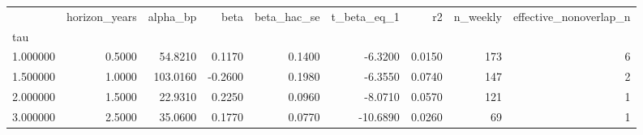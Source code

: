 \begin{tabular}{lrrrrrrrr}
\toprule
 & horizon\_years & alpha\_bp & beta & beta\_hac\_se & t\_beta\_eq\_1 & r2 & n\_weekly & effective\_nonoverlap\_n \\
tau &  &  &  &  &  &  &  &  \\
\midrule
1.000000 & 0.5000 & 54.8210 & 0.1170 & 0.1400 & -6.3200 & 0.0150 & 173 & 6 \\
1.500000 & 1.0000 & 103.0160 & -0.2600 & 0.1980 & -6.3550 & 0.0740 & 147 & 2 \\
2.000000 & 1.5000 & 22.9310 & 0.2250 & 0.0960 & -8.0710 & 0.0570 & 121 & 1 \\
3.000000 & 2.5000 & 35.0600 & 0.1770 & 0.0770 & -10.6890 & 0.0260 & 69 & 1 \\
\bottomrule
\end{tabular}
